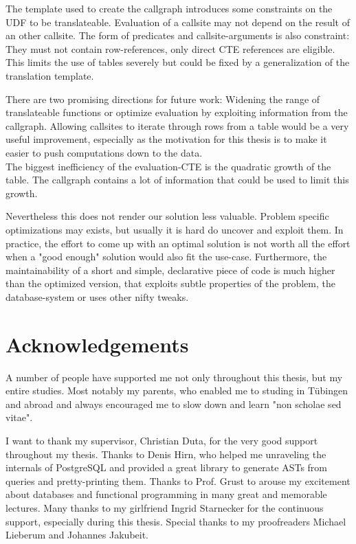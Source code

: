 The template used to create the callgraph introduces some constraints on the UDF to be translateable. Evaluation of a callsite may not depend on the result of an other callsite. The form of predicates and callsite-arguments is also constraint: They must not contain row-references, only direct CTE references are eligible. This limits the use of tables severely but could be fixed by a generalization of the translation template.

There are two promising directions for future work: Widening the range of translateable functions or optimize evaluation by exploiting information from the callgraph. Allowing callsites to iterate through rows from a table would be a very useful improvement, especially as the motivation for this thesis is to make it easier to push computations down to the data.\\
The biggest inefficiency of the evaluation-CTE is the quadratic growth of the table. The callgraph contains a lot of information that could be used to limit this growth.

Nevertheless this does not render our solution less valuable. Problem specific optimizations may exists, but usually it is hard do uncover and exploit them. In practice, the effort to come up with an optimal solution is not worth all the effort when a "good enough" solution would also fit the use-case. Furthermore, the maintainability of a short and simple, declarative piece of code is much higher than the optimized version, that exploits subtle properties of the problem, the database-system or uses other nifty tweaks.

\section*{Acknowledgements}
A number of people have supported me not only throughout this thesis, but my entire studies. Most notably my parents, who enabled me to studing in Tübingen and abroad and always encouraged me to slow down and learn "non scholae sed vitae".

I want to thank my supervisor, Christian Duta, for the very good support throughout my thesis. Thanks to Denis Hirn, who helped me unraveling the internals of PostgreSQL and provided a great library to generate ASTs from queries and pretty-printing them. Thanks to Prof. Grust to arouse my excitement about databases and functional programming in many great and memorable lectures. 
Many thanks to my girlfriend Ingrid Starnecker for the continuous support, especially during this thesis. Special thanks to my proofreaders Michael Lieberum and Johannes Jakubeit.